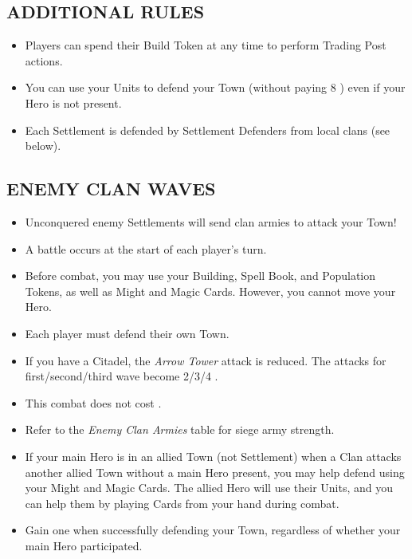 \begin{multicols}{2}
\subsection*{\MakeUppercase{Additional Rules}}

\begin{itemize}
  \item Players can spend their Build Token at any time to perform Trading Post actions.
  \item You can use your Units to defend your Town (without paying 8 ) even if your Hero is not present.
  \item Each Settlement is defended by Settlement Defenders from local clans (see below).
\end{itemize}

\subsection*{\MakeUppercase{Enemy clan waves}}
\begin{itemize}
  \item Unconquered enemy Settlements will send clan armies to attack your Town!
  \item A battle occurs at the start of each player's turn.
  \item Before combat, you may use your Building, Spell Book, and Population Tokens, as well as Might and Magic Cards. However, you cannot move your Hero.
  \item Each player must defend their own Town.
  \item If you have a Citadel, the \textit{Arrow Tower} attack is reduced. The attacks for first/second/third wave become 2/3/4 .
  \item This combat does not cost .
  \item Refer to the \textit{Enemy Clan Armies} table for siege army strength.
  \item If your main Hero is in an allied Town (not Settlement) when a Clan attacks another allied Town without a main Hero present, you may help defend using your Might and Magic Cards. The allied Hero will use their Units, and you can help them by playing Cards from your hand during combat.
  \item Gain one  when successfully defending your Town, regardless of whether your main Hero participated.
\end{itemize}

\vspace*{\fill}
\columnbreak


\end{multicols}
